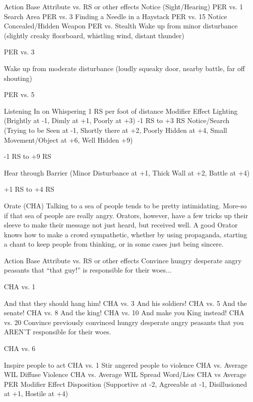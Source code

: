 \documentclass[oneside,11pt,english]{book}
\begin{document}
 

Action Base Attribute vs. RS 
or other effects 
Notice (Sight/Hearing) PER vs. 1 
Search Area PER vs. 3 
Finding a Needle in a Haystack PER vs. 15 
Notice Concealed/Hidden Weapon PER vs. Stealth 
Wake up from minor disturbance (slightly creaky floorboard, whistling wind, 
distant thunder) 

PER vs. 3 

Wake up from moderate disturbance (loudly squeaky door, nearby battle, far 
off shouting) 

PER vs. 5 

Listening In on Whispering 1 RS per foot of distance 
Modifier Effect 
Lighting (Brightly at -1, Dimly at +1, Poorly at +3) -1 RS to +3 RS 
Notice/Search (Trying to be Seen at -1, Shortly there at +2, Poorly Hidden at 
+4, Small Movement/Object at +6, Well Hidden +9) 

-1 RS to +9 RS 

Hear through Barrier (Minor Disturbance at +1, Thick Wall at +2, Battle at 
+4) 

+1 RS to +4 RS 

 

 

Orate (CHA) 
Talking to a sea of people tends to be pretty intimidating. More-so if that sea of people are really angry. 
Orators, however, have a few tricks up their sleeve to make their message not just heard, but received 
well. A good Orator knows how to make a crowd sympathetic, whether by using propaganda, starting a 
chant to keep people from thinking, or in some cases just being sincere. 

 


Action Base Attribute vs. RS or 
other effects 
Convince hungry desperate angry peasants that “that guy!” is responsible 
for their woes... 

CHA vs. 1 

And that they should hang him! CHA vs. 3 
And his soldiers! CHA vs. 5 
And the senate! CHA vs. 8 
And the king! CHA vs. 10 
And make you King instead! CHA vs. 20 
Convince previously convinced hungry desperate angry peasants that you 
AREN’T responsible for their woes. 

CHA vs. 6 

Inspire people to act CHA vs. 1 
Stir angered people to violence CHA vs. Average WIL 
Diffuse Violence CHA vs. Average WIL 
Spread Word/Lies CHA vs Average PER 
Modifier Effect 
Disposition (Supportive at -2, Agreeable at -1, Disillusioned at +1, Hostile at +4)
\end{document}
